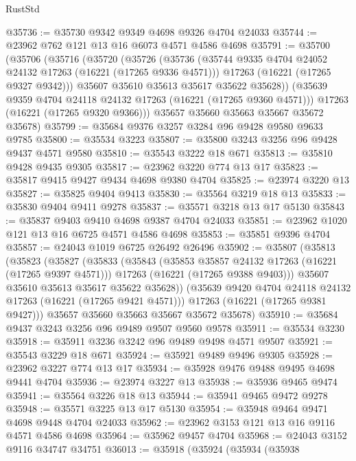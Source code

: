 \begin{lexlean}{RustStd}
\begin{coremodule}
@35736 := @35730 @9342 @9349 @4698 @9326 @4704 @24033
@35744 := @23962 @762 @121 @13 @16 @6073 @4571 @4586 @4698
@35791 := @35700
    (@35706
      (@35716
        (@35720
          (@35726
            (@35736
              (@35744 @9335 @4704 @24052 @24132 @17263 (@16221 (@17265 @9336 @4571)))
              @17263
              (@16221 (@17265 @9327 @9342)))
            @35607
            @35610
            @35613
            @35617
            @35622
            @35628))
        (@35639 @9359 @4704 @24118 @24132 @17263 (@16221 (@17265 @9360 @4571)))
        @17263
        (@16221 (@17265 @9320 @9366)))
      @35657
      @35660
      @35663
      @35667
      @35672
      @35678)
@35799 := @35684 @9376 @3257 @3284 @96 @9428 @9580 @9633 @9785
@35800 := @35534 @3223
@35807 := @35800 @3243 @3256 @96 @9428 @9437 @4571 @9580
@35810 := @35543 @3222 @18 @671
@35813 := @35810 @9428 @9435 @9305
@35817 := @23962 @3220 @774 @13 @17
@35823 := @35817 @9415 @9427 @9434 @4698 @9380 @4704
@35825 := @23974 @3220 @13
@35827 := @35825 @9404 @9413
@35830 := @35564 @3219 @18 @13
@35833 := @35830 @9404 @9411 @9278
@35837 := @35571 @3218 @13 @17 @5130
@35843 := @35837 @9403 @9410 @4698 @9387 @4704 @24033
@35851 := @23962 @1020 @121 @13 @16 @6725 @4571 @4586 @4698
@35853 := @35851 @9396 @4704
@35857 := @24043 @1019 @6725 @26492 @26496
@35902 := @35807
    (@35813
      (@35823
        (@35827
          (@35833
            (@35843
              (@35853 @35857 @24132 @17263 (@16221 (@17265 @9397 @4571)))
              @17263
              (@16221 (@17265 @9388 @9403)))
            @35607
            @35610
            @35613
            @35617
            @35622
            @35628))
        (@35639 @9420 @4704 @24118 @24132 @17263 (@16221 (@17265 @9421 @4571)))
        @17263
        (@16221 (@17265 @9381 @9427)))
      @35657
      @35660
      @35663
      @35667
      @35672
      @35678)
@35910 := @35684 @9437 @3243 @3256 @96 @9489 @9507 @9560 @9578
@35911 := @35534 @3230
@35918 := @35911 @3236 @3242 @96 @9489 @9498 @4571 @9507
@35921 := @35543 @3229 @18 @671
@35924 := @35921 @9489 @9496 @9305
@35928 := @23962 @3227 @774 @13 @17
@35934 := @35928 @9476 @9488 @9495 @4698 @9441 @4704
@35936 := @23974 @3227 @13
@35938 := @35936 @9465 @9474
@35941 := @35564 @3226 @18 @13
@35944 := @35941 @9465 @9472 @9278
@35948 := @35571 @3225 @13 @17 @5130
@35954 := @35948 @9464 @9471 @4698 @9448 @4704 @24033
@35962 := @23962 @3153 @121 @13 @16 @9116 @4571 @4586 @4698
@35964 := @35962 @9457 @4704
@35968 := @24043 @3152 @9116 @34747 @34751
@36013 := @35918
    (@35924
      (@35934
        (@35938

\end{coremodule}
\end{lexlean}
